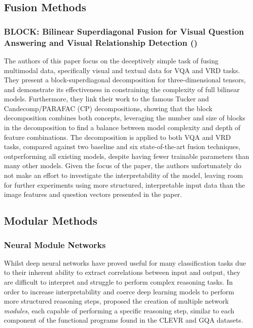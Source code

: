 \subsection{Fusion Methods}

\subsubsection*{BLOCK: Bilinear Superdiagonal Fusion for Visual Question Answering and Visual Relationship Detection (\cite{ben2019block})}

The authors of this paper focus on the deceptively simple task of fusing multimodal data, specifically visual and textual data for VQA and VRD tasks. They present a block-superdiagonal decomposition for three-dimensional tensors, and demonstrate its effectiveness in constraining the complexity of full bilinear models. Furthermore, they link their work to the famous Tucker \cite{tucker1966some} and Candecomp/PARAFAC (CP) \cite{harshman1970foundations} decompositions, showing that the block decomposition combines both concepts, leveraging the number and size of blocks in the decomposition to find a balance between model complexity and depth of feature combinations. The decomposition is applied to both VQA and VRD tasks, compared against two baseline and six state-of-the-art fusion techniques, outperforming all existing models, despite having fewer trainable parameters than many other models. Given the focus of the paper, the authors unfortunately do not make an effort to investigate the interpretability of the model, leaving room for further experiments using more structured, interpretable input data than the image features and question vectors presented in the paper.

\subsection{Modular Methods}

\subsubsection{Neural Module Networks}

Whilst deep neural networks have proved useful for many classification tasks due to their inherent ability to extract correlations between input and output, they are difficult to interpret and struggle to perform complex reasoning tasks. In order to increase interpretability and coerce deep learning models to perform more structured reasoning steps, \citeauthor{andreas2016neural} \cite{andreas2016neural} proposed the creation of multiple network \textit{modules}, each capable of performing a specific reasoning step, similar to each component of the functional programs found in the CLEVR and GQA datasets.

